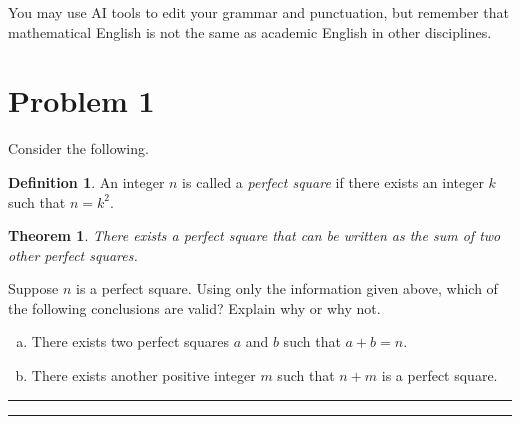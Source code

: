 \documentclass{article}
\newtheorem*{theorem}{Theorem} %
\theoremstyle{definition}
\newtheorem*{definition}{Definition} %
\newenvironment{solution}{\bigskip\hrule{\hfill}}{\bigskip\hrule{\hfill}} %
\begin{document}
You may use AI tools to edit your grammar and punctuation, but remember that mathematical English is not the same as academic English in other disciplines. 

\vfill

\newpage


\section*{Problem 1}

Consider the following.

\begin{definition}
    An integer $n$ is called a \emph{perfect square} if there exists an integer $k$ such that $n=k^2$.
\end{definition}
\begin{theorem}
    There exists a perfect square that can be written as the sum of two other perfect squares.
\end{theorem}

Suppose $n$ is a perfect square. Using only the information given above, which of the following conclusions are valid? Explain why or why not.

\begin{enumerate}[a)] %
    \item There exists two perfect squares $a$ and $b$ such that $a+b=n$.

    \item There exists another positive integer $m$ such that $n+m$ is a perfect square.
\end{enumerate}

\begin{solution}


\end{solution}


\newpage

\end{document}
